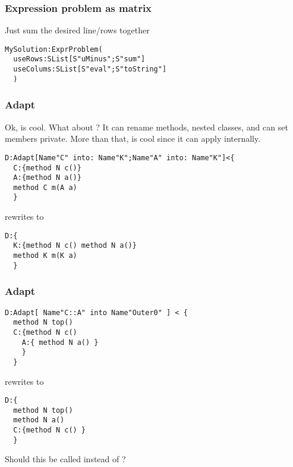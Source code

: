 \begin{frame}[fragile]
\frametitle{Expression problem as matrix}
Just sum the desired line/rows together
\begin{NiceCode}{59ex}{0.8}
\begin{lstlisting}
MySolution:ExprProblem(
  useRows:SList[S"uMinus";S"sum"]
  useColums:SList[S"eval";S"toString"]
  )
\end{lstlisting}
\end{NiceCode}




\end{frame}



\begin{frame}[fragile]
\frametitle{Adapt}
Ok, \Q@Compose@ is cool.
What about \Q@Adapt@?
It can rename methods, nested classes, and can set members private.
More than that, \Q@Adapt@ is cool since it can apply \Q@Compose@ internally.
\begin{NiceCode}{59ex}{0.8}
\begin{lstlisting}
D:Adapt[Name"C" into: Name"K";Name"A" into: Name"K"]<{
  C:{method N c()}
  A:{method N a()}
  method C m(A a)
  }
\end{lstlisting}
\end{NiceCode}
rewrites to 
\begin{NiceCode}{59ex}{0.8}
\begin{lstlisting}
D:{
  K:{method N c() method N a()}
  method K m(K a)
  }
\end{lstlisting}
\end{NiceCode}
\end{frame}


\begin{frame}[fragile]
\begin{NiceCode}{59ex}{0.8}
\frametitle{Adapt}
\begin{lstlisting}
D:Adapt[ Name"C::A" into Name"Outer0" ] < {
  method N top()
  C:{method N c()
    A:{ method N a() }
    }
  }
\end{lstlisting}
\end{NiceCode}
rewrites to 
\begin{NiceCode}{59ex}{0.8}
\begin{lstlisting}
D:{
  method N top()
  method N a()
  C:{method N c() }
  }
\end{lstlisting}
\end{NiceCode}
Should this be called \Q@Move@ instead of \Q@Adapt@?

\end{frame}


